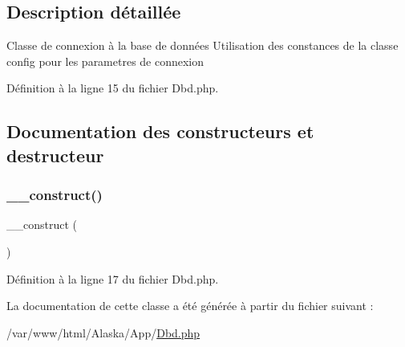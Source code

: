 \subsection{Description détaillée}
Classe de connexion à la base de données Utilisation des constances de la classe config pour les parametres de connexion 

Définition à la ligne 15 du fichier Dbd.\+php.



\subsection{Documentation des constructeurs et destructeur}
\mbox{\label{class_app_1_1_dbd_a095c5d389db211932136b53f25f39685}} 
\subsubsection{\texorpdfstring{\+\_\+\+\_\+construct()}{\_\_construct()}}
{\footnotesize\ttfamily \+\_\+\+\_\+construct (\begin{DoxyParamCaption}{ }\end{DoxyParamCaption})}



Définition à la ligne 17 du fichier Dbd.\+php.



La documentation de cette classe a été générée à partir du fichier suivant \+:\begin{DoxyCompactItemize}
\item 
/var/www/html/\+Alaska/\+App/\hyperlink{_dbd_8php}{Dbd.\+php}\end{DoxyCompactItemize}
